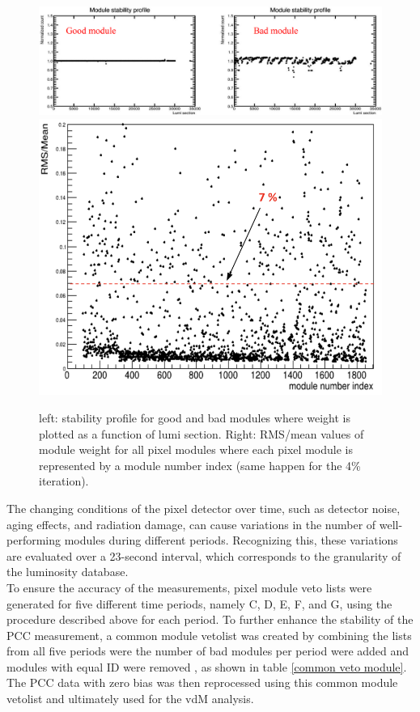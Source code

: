\begin{center}
  \begin{figure}[h!]
    \centering
    \includegraphics[scale=.17]{Chapter4/good_module.png}\includegraphics[scale=.15]{Chapter4/RMSmean.png}
    \caption[RMS/mean Module  Stability]{ left: stability profile for good and bad modules where weight is plotted as a function of lumi section.  Right: RMS/mean values of module weight for all pixel modules  where each pixel module is represented by a module number index (same happen for the 4\% iteration).} 
    \label{goodmodule}
  \end{figure}
\end{center}

The changing conditions of the pixel detector over time, such as detector noise, aging effects, and radiation damage, can cause variations in the number of well-performing modules during different periods. Recognizing this, these variations are evaluated over a 23-second interval, which corresponds to the granularity of the luminosity database.\\

To ensure the accuracy of the measurements, pixel module veto lists were generated for five different time periods, namely C, D, E, F, and G, using the procedure described above for each period. To further enhance the stability of the PCC measurement, a common module vetolist was created by combining the lists from all five periods were the number of bad modules per period were added and modules with equal ID were removed , as shown in table \ref{common veto module}. The PCC data with zero bias was then reprocessed using this common module vetolist and ultimately used for the vdM analysis.

